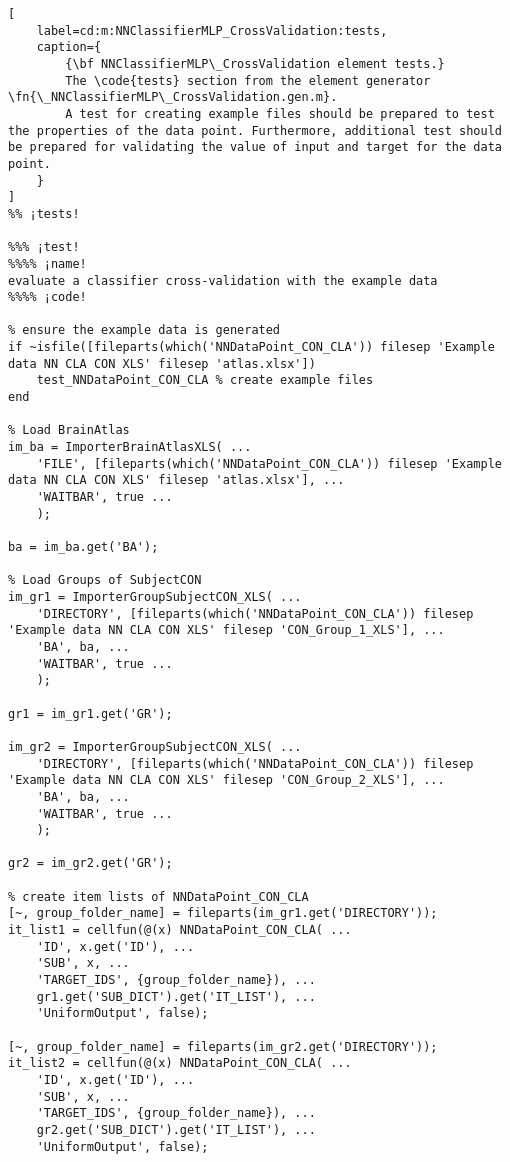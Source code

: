 \documentclass{tufte-handout}
\begin{document}
\clearpage

\begin{lstlisting}[
	label=cd:m:NNClassifierMLP_CrossValidation:tests,
	caption={
		{\bf NNClassifierMLP\_CrossValidation element tests.}
		The \code{tests} section from the element generator \fn{\_NNClassifierMLP\_CrossValidation.gen.m}.
		A test for creating example files should be prepared to test the properties of the data point. Furthermore, additional test should be prepared for validating the value of input and target for the data point.
	}
]			
%% ¡tests!

%%% ¡test!
%%%% ¡name!
evaluate a classifier cross-validation with the example data
%%%% ¡code!

% ensure the example data is generated
if ~isfile([fileparts(which('NNDataPoint_CON_CLA')) filesep 'Example data NN CLA CON XLS' filesep 'atlas.xlsx'])
    test_NNDataPoint_CON_CLA % create example files
end

% Load BrainAtlas
im_ba = ImporterBrainAtlasXLS( ...
    'FILE', [fileparts(which('NNDataPoint_CON_CLA')) filesep 'Example data NN CLA CON XLS' filesep 'atlas.xlsx'], ...
    'WAITBAR', true ...
    );

ba = im_ba.get('BA');

% Load Groups of SubjectCON
im_gr1 = ImporterGroupSubjectCON_XLS( ...
    'DIRECTORY', [fileparts(which('NNDataPoint_CON_CLA')) filesep 'Example data NN CLA CON XLS' filesep 'CON_Group_1_XLS'], ...
    'BA', ba, ...
    'WAITBAR', true ...
    );

gr1 = im_gr1.get('GR');

im_gr2 = ImporterGroupSubjectCON_XLS( ...
    'DIRECTORY', [fileparts(which('NNDataPoint_CON_CLA')) filesep 'Example data NN CLA CON XLS' filesep 'CON_Group_2_XLS'], ...
    'BA', ba, ...
    'WAITBAR', true ...
    );

gr2 = im_gr2.get('GR');

% create item lists of NNDataPoint_CON_CLA
[~, group_folder_name] = fileparts(im_gr1.get('DIRECTORY'));
it_list1 = cellfun(@(x) NNDataPoint_CON_CLA( ...
    'ID', x.get('ID'), ...
    'SUB', x, ...
    'TARGET_IDS', {group_folder_name}), ...
    gr1.get('SUB_DICT').get('IT_LIST'), ...
    'UniformOutput', false);

[~, group_folder_name] = fileparts(im_gr2.get('DIRECTORY'));
it_list2 = cellfun(@(x) NNDataPoint_CON_CLA( ...
    'ID', x.get('ID'), ...
    'SUB', x, ...
    'TARGET_IDS', {group_folder_name}), ...
    gr2.get('SUB_DICT').get('IT_LIST'), ...
    'UniformOutput', false);


\end{lstlisting}
\end{document}
